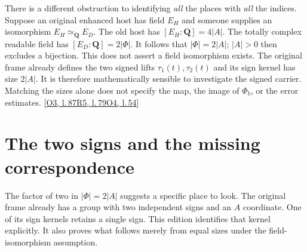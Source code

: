 \documentclass[12pt,letterpaper]{article}
\begin{document}
There is a different obstruction to identifying \emph{all} the places with \emph{all} the indices. Suppose an original enhanced host has field $E_H$ and someone supplies an isomorphism $E_H\simeq_{\mathbf Q} E_D$. The old host has $[E_H:\mathbf Q]=4|A|$. The totally complex readable field has $[E_D:\mathbf Q]=2|\Phi|$. It follows that $|\Phi|=2|A|$; $|A|>0$ then excludes a bijection. This does not assert a field isomorphism exists. The original frame already defines the two signed lifts $\tau_1(t),\tau_2(t)$ and its sign kernel has size $2|A|$. It is therefore mathematically sensible to investigate the signed carrier. Matching the sizes alone does not specify the map, the image of $\Phi_b$, or the error estimates. {\footnotesize\sffamily\color{mute}[\href{https://github.com/nousentllc/riemann-hypothesis/blob/40e56bab026552e089d7afcfeff08d2defb9c005/src/Formalism/SharpRestriction/RamificationFrobenius/TotientGaloisClasses/ConjEMemHostFIff.lean\#L87}{O3, l.\,87}\enspace \href{https://github.com/leanprover-community/riemann-hypothesis/blob/e063a923620ee7787b4a1270421478645bf66bdb/src/Lib/General/NumberTheory/EmbeddingsAndDifferent.lean\#L79}{R5, l.\,79}\enspace \href{https://github.com/nousentllc/riemann-hypothesis/blob/40e56bab026552e089d7afcfeff08d2defb9c005/src/Formalism/SharpRestriction/RamificationFrobenius/TotientGaloisClasses/FrameFacts.lean\#L54}{O4, l.\,54}]}

\section{The two signs and the missing correspondence}\label{sec:signed}
The factor of two in $|\Phi|=2|A|$ suggests a specific place to look. The original frame already has a group with two independent signs and an $A$ coordinate. One of its sign kernels retains a single sign. This edition identifies that kernel explicitly. It also proves what follows merely from equal sizes under the field-isomorphism assumption.
\end{document}

